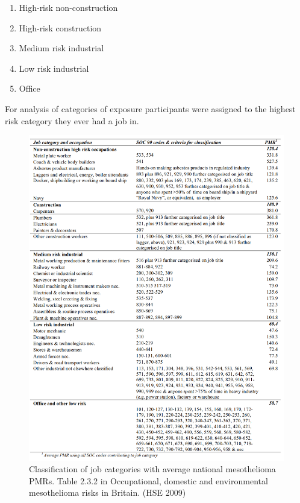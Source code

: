 \begin{enumerate}
\def\labelenumi{\arabic{enumi}.}
\tightlist
\item
  High-risk non-construction
\item
  High-risk construction
\item
  Medium risk industrial
\item
  Low risk industrial
\item
  Office
\end{enumerate}

For analysis of categories of exposure participants were assigned to the
highest risk category they ever had a job in.

\begin{figure}
\centering
\includegraphics{source/figures/job_classification.png}
\caption{Classification of job categories with average national
mesothelioma PMRs. Table 2.3.2 in Occupational, domestic and
environmental mesothelioma risks in Britain. (HSE 2009)}
\end{figure}

